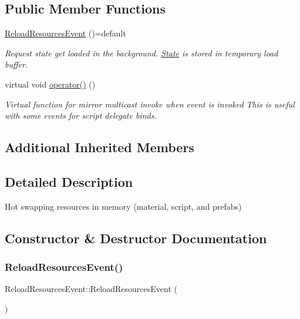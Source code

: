 \subsection*{Public Member Functions}
\begin{DoxyCompactItemize}
\item 
\hyperlink{classReloadResourcesEvent_adab77345ef791eb81b5ac6afb2e78262}{Reload\+Resources\+Event} ()=default
\begin{DoxyCompactList}\small\item\em Request state get loaded in the background. \hyperlink{classState}{State} is stored in temporary load buffer. \end{DoxyCompactList}\item 
\mbox{\label{classReloadResourcesEvent_a8046debda22e632f9a0ae7cd9654958a}} 
virtual void \hyperlink{classReloadResourcesEvent_a8046debda22e632f9a0ae7cd9654958a}{operator()} ()
\begin{DoxyCompactList}\small\item\em Virtual function for mirror multicast invoke when event is invoked This is useful with some events for script delegate binds. \end{DoxyCompactList}\end{DoxyCompactItemize}
\subsection*{Additional Inherited Members}


\subsection{Detailed Description}
Hot swapping resources in memory (material, script, and prefabs) 

\subsection{Constructor \& Destructor Documentation}
\mbox{\label{classReloadResourcesEvent_adab77345ef791eb81b5ac6afb2e78262}} 
\subsubsection{\texorpdfstring{Reload\+Resources\+Event()}{ReloadResourcesEvent()}}
{\footnotesize\ttfamily Reload\+Resources\+Event\+::\+Reload\+Resources\+Event (\begin{DoxyParamCaption}{ }\end{DoxyParamCaption})\hspace{0.3cm}{\ttfamily [default]}}



